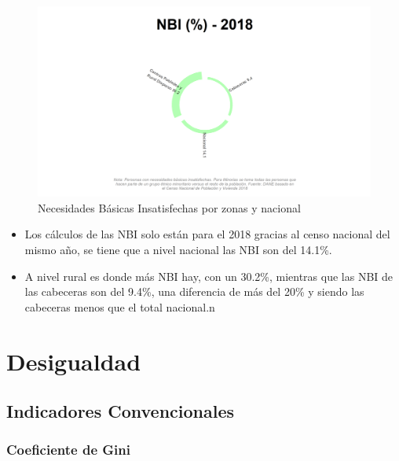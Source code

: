     \begin{figure}[H]
        \caption{Necesidades Básicas Insatisfechas por zonas y nacional \label{map_result_2} }
        \begin{center}
        \includegraphics[width=\textwidth,keepaspectratio]{img/var_276_static.png}
        \end{center}
    \end{figure}
            \begin{itemize}
                    \item Los cálculos de las NBI solo están para el 2018 gracias al censo nacional del mismo año, se tiene que a nivel nacional las NBI son del 14.1\%.
                    \item A nivel rural es donde más NBI hay, con un 30.2\%, mientras que las NBI de las cabeceras son del 9.4\%, una diferencia de más del 20\% y siendo las cabeceras menos que el total nacional.n
                    \end{itemize}

\section{Desigualdad}
    \subsection{Indicadores Convencionales}
        \subsubsection{Coeficiente de Gini}

